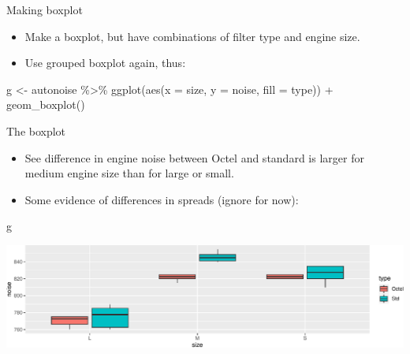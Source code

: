 \documentclass[
  ignorenonframetext,
]{beamer}
\newenvironment{Shaded}{\begin{snugshade}}{\end{snugshade}}
\newcommand{\AttributeTok}[1]{\textcolor[rgb]{0.40,0.45,0.13}{#1}}
\newcommand{\FunctionTok}[1]{\textcolor[rgb]{0.28,0.35,0.67}{#1}}
\newcommand{\NormalTok}[1]{\textcolor[rgb]{0.00,0.23,0.31}{#1}}
\newcommand{\OtherTok}[1]{\textcolor[rgb]{0.00,0.23,0.31}{#1}}
\newcommand{\SpecialCharTok}[1]{\textcolor[rgb]{0.37,0.37,0.37}{#1}}
\begin{document}
\begin{frame}[fragile]{Making boxplot}
\protect\hypertarget{making-boxplot}{}
\begin{itemize}
\item
  Make a boxplot, but have combinations of filter type and engine size.
\item
  Use grouped boxplot again, thus:
\end{itemize}

\begin{Shaded}
\begin{Highlighting}[]
\NormalTok{g }\OtherTok{\textless{}{-}}\NormalTok{ autonoise }\SpecialCharTok{\%\textgreater{}\%}
  \FunctionTok{ggplot}\NormalTok{(}\FunctionTok{aes}\NormalTok{(}\AttributeTok{x =}\NormalTok{ size, }\AttributeTok{y =}\NormalTok{ noise, }\AttributeTok{fill =}\NormalTok{ type)) }\SpecialCharTok{+}
  \FunctionTok{geom\_boxplot}\NormalTok{()}
\end{Highlighting}
\end{Shaded}
\end{frame}

\begin{frame}[fragile]{The boxplot}
\protect\hypertarget{the-boxplot}{}
\begin{itemize}
\item
  See difference in engine noise between Octel and standard is larger
  for medium engine size than for large or small.
\item
  Some evidence of differences in spreads (ignore for now):
\end{itemize}

\begin{Shaded}
\begin{Highlighting}[]
\NormalTok{g}
\end{Highlighting}
\end{Shaded}

\includegraphics{anova_files/figure-beamer/bAnova-26-1.pdf}
\end{frame}
\end{document}
